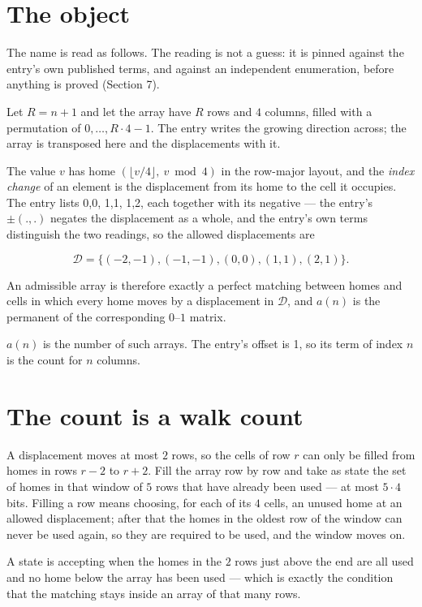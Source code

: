 \documentclass[11pt]{article}
\theoremstyle{definition}
\begin{document}
\section{The object}

The name is read as follows. The reading is not a guess: it is pinned against the entry's own published terms, and against an independent enumeration, before anything is proved (Section 7).

Let $R = n + 1$ and let the array have $R$ rows and $4$ columns, filled with a permutation of $0,\dots,R\cdot4-1$. The entry writes the growing direction across; the array is transposed here and the displacements with it.

The value $v$ has home $(\lfloor v/4\rfloor,\ v \bmod 4)$ in the row-major layout, and the {\itshape index change} of an element is the displacement from its home to the cell it occupies. The entry lists 0,0, 1,1, 1,2, each together with its negative --- the entry's $\pm(.,.)$ negates the displacement as a whole, and the entry's own terms distinguish the two readings, so the allowed displacements are

\[\mathcal{D} = \{(-2,-1), (-1,-1), (0,0), (1,1), (2,1)\}.\]

An admissible array is therefore exactly a perfect matching between homes and cells in which every home moves by a displacement in $\mathcal{D}$, and $a(n)$ is the permanent of the corresponding $0$--$1$ matrix.

$a(n)$ is the number of such arrays. The entry's offset is 1, so its term of index $n$ is the count for $n$ columns.

\section{The count is a walk count}

A displacement moves at most $2$ rows, so the cells of row $r$ can only be filled from homes in rows $r-2$ to $r+2$. Fill the array row by row and take as state the set of homes in that window of $5$ rows that have already been used --- at most $5\cdot4$ bits. Filling a row means choosing, for each of its $4$ cells, an unused home at an allowed displacement; after that the homes in the oldest row of the window can never be used again, so they are required to be used, and the window moves on.

A state is accepting when the homes in the $2$ rows just above the end are all used and no home below the array has been used --- which is exactly the condition that the matching stays inside an array of that many rows.
\end{document}
